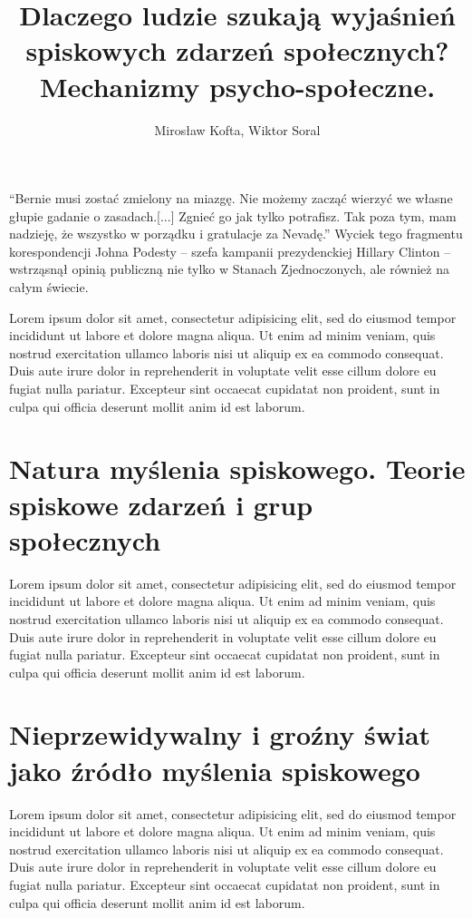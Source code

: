 \documentclass[man]{apa6}
\title{Dlaczego ludzie szukają wyjaśnień spiskowych zdarzeń społecznych? Mechanizmy psycho-społeczne.}
\author{Mirosław Kofta, Wiktor Soral}
\affiliation{Uniwersytet Warszawski}
\begin{document}
    \maketitle

    ``Bernie musi zostać zmielony na miazgę. Nie możemy zacząć wierzyć we własne głupie gadanie o zasadach.[...] Zgnieć go jak tylko potrafisz. Tak poza tym, mam nadzieję, że wszystko w porządku i gratulacje za Nevadę.'' Wyciek tego fragmentu korespondencji Johna Podesty -- szefa kampanii prezydenckiej Hillary Clinton -- wstrząsnął opinią publiczną nie tylko w Stanach Zjednoczonych, ale również na całym świecie.

    Lorem ipsum dolor sit amet, consectetur adipisicing elit, sed do eiusmod tempor incididunt ut labore et dolore magna aliqua. Ut enim ad minim veniam, quis nostrud exercitation ullamco laboris nisi ut aliquip ex ea commodo consequat. Duis aute irure dolor in reprehenderit in voluptate velit esse cillum dolore eu fugiat nulla pariatur. Excepteur sint occaecat cupidatat non proident, sunt in culpa qui officia deserunt mollit anim id est laborum.

    \section{Natura myślenia spiskowego. Teorie spiskowe zdarzeń i grup społecznych}

    Lorem ipsum dolor sit amet, consectetur adipisicing elit, sed do eiusmod tempor incididunt ut labore et dolore magna aliqua. Ut enim ad minim veniam, quis nostrud exercitation ullamco laboris nisi ut aliquip ex ea commodo consequat. Duis aute irure dolor in reprehenderit in voluptate velit esse cillum dolore eu fugiat nulla pariatur. Excepteur sint occaecat cupidatat non proident, sunt in culpa qui officia deserunt mollit anim id est laborum.

    \section{Nieprzewidywalny i groźny świat jako źródło myślenia spiskowego}

    Lorem ipsum dolor sit amet, consectetur adipisicing elit, sed do eiusmod tempor incididunt ut labore et dolore magna aliqua. Ut enim ad minim veniam, quis nostrud exercitation ullamco laboris nisi ut aliquip ex ea commodo consequat. Duis aute irure dolor in reprehenderit in voluptate velit esse cillum dolore eu fugiat nulla pariatur. Excepteur sint occaecat cupidatat non proident, sunt in culpa qui officia deserunt mollit anim id est laborum.
\end{document}
